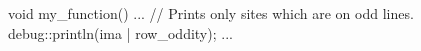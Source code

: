 void my_function()
{
  ...
  // Prints only sites which are on odd lines.
  debug::println(ima | row_oddity);
  ...
}
